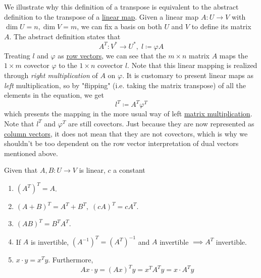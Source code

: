   We illustrate why this definition of a transpose is equivalent to the abstract definition to the transpose of a \hyperref[def:linear_map]{linear map}. Given a linear map $A: U \to V$ with $\dim U = n, \dim V = m$, we can fix a basis on both $U$ and $V$ to define its matrix $A$. The abstract definition states that 
  \begin{equation}
    A^T: V^\ast \to U^\ast, \; l \coloneqq \varphi A
  \end{equation}
  Treating $l$ and $\varphi$ as \hyperref[def:row-vector]{row vectors}, we can see that the $m \times n$ matrix $A$ maps the $1 \times m$ covector $\varphi$ to the $1 \times n$ covector $l$. Note that this linear mapping is realized through \textit{right multiplication} of $A$ on $\varphi$. It is customary to present linear maps as \textit{left} multiplication, so by "flipping" (i.e. taking the matrix transpose) of all the elements in the equation, we get 
  \begin{equation}
    l^T \coloneqq A^T \varphi^T
  \end{equation}
  which presents the mapping in the more usual way of left \hyperref[def:matrix-multiplication]{matrix multiplication}. Note that $l^T$ and $\varphi^T$ are still covectors. Just because they are now represented as \hyperref[def:column-vector]{column vectors}, it does not mean that they are not covectors, which is why we shouldn't be too dependent on the row vector interpretation of dual vectors mentioned above.  

  \begin{theorem}
    \label{thm:properties-of-the-matrix-transpose}
    Given that $A, B: U \to V$ is linear, $c$ a constant
    \begin{enumerate}
      \item $(A^T)^T = A$. 
      \item $(A+B)^T = A^T + B^T, \; (c A)^T = c A^T$. 
      \item $(A B)^T = B^T A^T$. 
      \item If $A$ is invertible, $(A^{-1})^T = (A^T)^{-1}$ and $A$ invertible $\implies A^T$ invertible. 
      \item $x \cdot y = x^T y$. Furthermore, 
      \begin{equation}
        Ax \cdot y = (A x)^T y = x^T A^T y = x \cdot A^T y
      \end{equation}
    \end{enumerate}
  \end{theorem}

